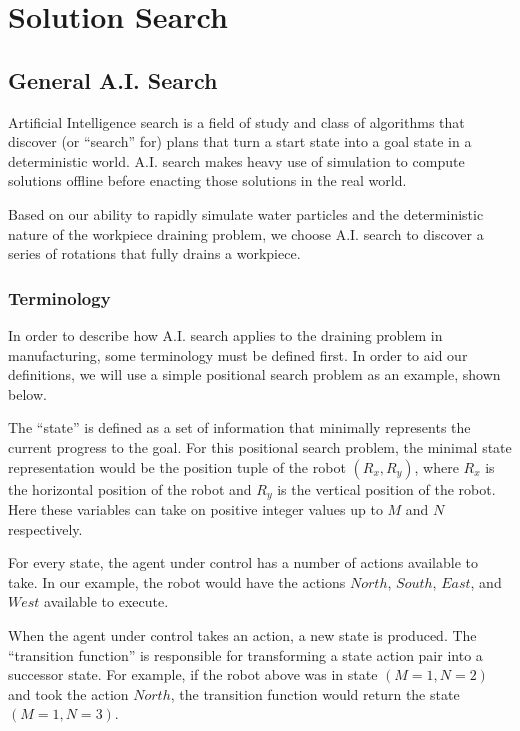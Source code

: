 								\chapter{Solution Search}

\section{General A.I. Search}

Artificial Intelligence search is a field of study and class of algorithms that discover (or ``search'' for) plans that turn a start state into a goal state in a deterministic world. A.I. search makes heavy use of simulation to compute solutions offline before enacting those solutions in the real world.

Based on our ability to rapidly simulate water particles and the deterministic nature of the workpiece draining problem, we choose A.I. search to discover a series of rotations that fully drains a workpiece.

	\subsection{Terminology}

In order to describe how A.I. search applies to the draining problem in manufacturing, some terminology must be defined first. In order to aid our definitions, we will use a simple positional search problem as an example, shown below.


The ``state'' is defined as a set of information that minimally represents the current progress to the goal. For this positional search problem, the minimal state representation would be the position tuple of the robot $(R_x,R_y)$, where $R_x$ is the horizontal position of the robot and $R_y$ is the vertical position of the robot. Here these variables can take on positive integer values up to $M$ and $N$ respectively.

For every state, the agent under control has a number of actions available to take. In our example, the robot would have the actions $North$, $South$, $East$, and $West$ available to execute.

When the agent under control takes an action, a new state is produced. The ``transition function'' is responsible for transforming a state action pair into a successor state. For example, if the robot above was in state $(M = 1, N = 2)$ and took the action $North$, the transition function would return the state $(M = 1, N = 3)$.

